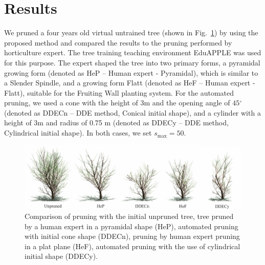 
\section{Results}
We pruned a four years old virtual
untrained tree (shown in Fig.~\ref{fig:my_figure4}) by using the proposed method and
compared the results to the pruning performed by horticulture expert.
The tree training teaching environment EduAPPLE \cite{kohek_eduapple:_2015} was used for
this purpose. The expert shaped the tree into two primary forms, a
pyramidal growing form (denoted as HeP -- Human expert - Pyramidal), which is similar to a Slender Spindle, and a
growing form Flatt (denoted as HeF -- Human expert - Flatt), suitable for the Fruiting Wall planting system. 
For the automated pruning, we used a cone with the height of \(3\)m and the
opening angle of \(45{^\circ}\) (denoted as DDECn -- DDE method, Conical initial shape), and a cylinder with a height of
3m and radius of 0.75 m (denoted as DDECy -- DDE method, Cylindrical initial shape). 
In both cases, we set \(s_{\mathrm{\max}}=50\). 
\begin{figure}[hbt]
    \centering
    \includegraphics[width=5.4in]{figs/image4.jpeg}
    \caption{Comparison of pruning with the initial unpruned tree,
tree pruned by a human expert in a pyramidal shape (HeP), automated
pruning with initial cone shape (DDECn), pruning by human expert pruning
in a plat plane (HeF), automated pruning with the use of cylindrical
initial shape (DDECy). }
    \label{fig:my_figure4}
\end{figure}

